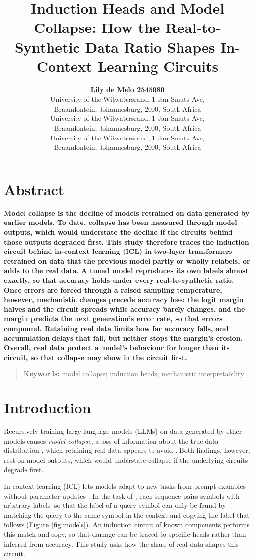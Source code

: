 \documentclass[10pt,letterpaper]{article}
\title{Induction Heads and Model Collapse: How the Real-to-Synthetic Data Ratio Shapes In-Context Learning Circuits}
\author{{\large \bf Lily de Melo 2545080 } \\ University of the Witwatersrand, 1 Jan Smuts Ave,\\ Braamfontein, Johannesburg, 2000, South Africa
  \AND {\large \bf Gopolang Mohlakola 2680747 } \\ University of the Witwatersrand, 1 Jan Smuts Ave,\\ Braamfontein, Johannesburg, 2000, South Africa
  \AND {\large \bf Tawananyasha Kadango 2588206} \\ University of the Witwatersrand, 1 Jan Smuts Ave,\\ Braamfontein, Johannesburg, 2000, South Africa}
\begin{document}
\maketitle
\phantom{.}
\newpage
\phantom{.}
\newpage
\section{Abstract}
{
\bf
{}
Model collapse is the decline of models retrained on data generated by earlier models. To date, collapse has been measured through model outputs, which would understate the decline if the circuits behind those outputs degraded first. This study therefore traces the induction circuit behind in-context learning (ICL) in two-layer transformers retrained on data that the previous model partly or wholly relabels, or adds to the real data. A tuned model reproduces its own labels almost exactly, so that accuracy holds under every real-to-synthetic ratio. Once errors are forced through a raised sampling temperature, however, mechanistic changes precede accuracy loss: the logit margin halves and the circuit spreads while accuracy barely changes, and the margin predicts the next generation's error rate, so that errors compound. Retaining real data limits how far accuracy falls, and accumulation delays that fall, but neither stops the margin's erosion. Overall, real data protect a model's behaviour for longer than its circuit, so that collapse may show in the circuit first.
}
\begin{quote}
\small
\textbf{Keywords:}
model collapse; induction heads; mechanistic interpretability
\end{quote}

\section{Introduction}
\label{Intro}

 Recursively training large language models (LLMs) on data generated by other models causes \emph{model collapse}, a loss of information about the true data distribution \citep{shumailov2024}, which retaining real data appears to avoid \citep{gerstgrasser2024}. Both findings, however, rest on model outputs, which would understate collapse if the underlying circuits degrade first.

In-context learning (ICL) lets models adapt to new tasks from prompt examples without parameter updates \citep{olsson2022, singh2024}. In the task of \citet{singh2024}, each sequence pairs symbols with arbitrary labels, so that the label of a query symbol can only be found by matching the query to the same symbol in the context and copying the label that follows (Figure~\ref{fig:models}). An induction circuit of known components performs this match and copy, so that damage can be traced to specific heads rather than inferred from accuracy. This study asks how the share of real data shapes this circuit.
\end{document}
